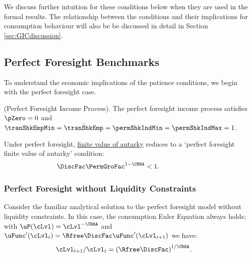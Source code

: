 \documentclass[BufferStockTheory]{subfiles}
\begin{document}
We discuss further intuition for these conditions below when they are used in the formal results. The relationship between the conditions and their implications for consumption behaviour will also be be discussed in detail in Section \ref{sec:GICdiscussion}.


\hypertarget{Perfect-Foresight-Benchmarks}{}
\subsection{Perfect Foresight Benchmarks}\label{subsec:PFBdiscussion}

To understand the economic implications of the patience conditions, we begin with the perfect foresight case. 

\begin{assumI}\label{ass:pfincome}(Perfect Foresight Income Process).
The perfect foresight income process satisfies $\pZero=0$ and $\tranShkEmpMin=\bar{\tranShkEmp}=\permShkIndMin=\permShkIndMax=1$.
\end{assumI}

Under perfect foresight,  \hyperlink{FVAC}{finite value of autarky} reduces to a `perfect foresight finite value of autarky' condition: 
%
\hypertarget{PFFVAC}{}
\begin{equation}\begin{gathered}\begin{aligned}  
         \DiscFac \PermGroFac^{1-\CRRA}  & <  1.  \phantom{\text{\PFFVAC:~~}}
\end{aligned}\end{gathered}\label{eq:PFFVAC}\end{equation}


\subsubsection{Perfect Foresight without Liquidity Constraints}\label{subsubsec:PFUncon}

Consider the familiar analytical solution to the perfect foresight model without liquidity constraints. In this case, the consumption Euler Equation always holds; with $\uP(\cLvl)=\cLvl^{-\CRRA}$ and $\uFunc^{\prime}(\cLvl_{t})=\Rfree\DiscFac\uFunc^{\prime}(\cLvl_{t+1})$ we have: \hypertarget{APFacDefn}{}
%
%
\begin{align}
  \cLvl_{t+1}/\cLvl_{t}  & = {(\Rfree\DiscFac)}^{1/\CRRA}. \label{eq:cGroFac}
\end{align} 
%
\end{document}
